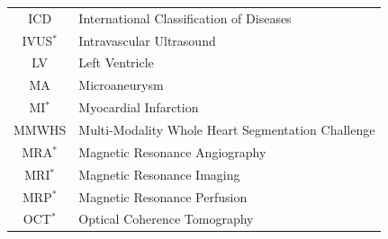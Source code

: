 \documentclass[journal]{IEEEtran}
\begin{document}
\begin{table}[!t]
\begin{minipage}{0.5\textwidth}
\begin{tabularx}{\textwidth}{c l}
			ICD                                                                                                                                                              & International Classification of Diseases                   \\
			IVUS$^*$                                                                                                                                                         & Intravascular Ultrasound                                   \\
			LV                                                                                                                                                               & Left Ventricle                                             \\
			MA                                                                                                                                                               & Microaneurysm                                              \\
			MI$^*$                                                                                                                                                           & Myocardial Infarction                                      \\
			MMWHS                                                                                                                                                            & Multi-Modality Whole Heart Segmentation Challenge          \\
			MRA$^*$                                                                                                                                                          & Magnetic Resonance Angiography                             \\
			MRI$^*$                                                                                                                                                          & Magnetic Resonance Imaging                                 \\
			MRP$^*$                                                                                                                                                          & Magnetic Resonance Perfusion                               \\
			OCT$^*$                                                                                                                                                          & Optical Coherence Tomography                               \\

\end{tabularx}
\end{minipage}
\end{table}
\end{document}
